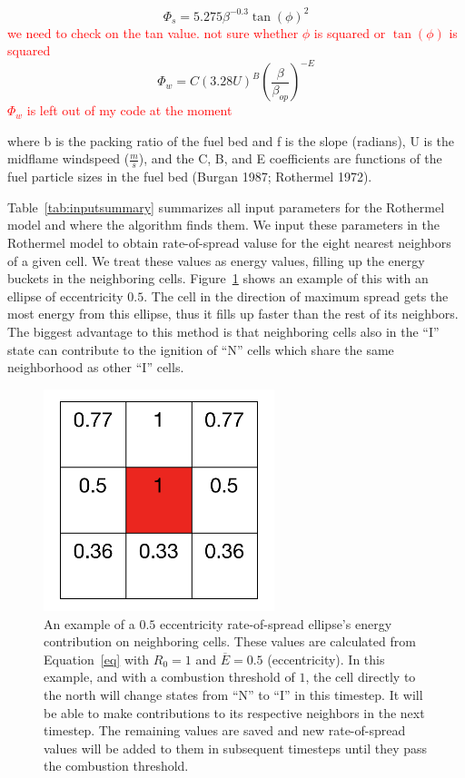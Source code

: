 \documentclass{article}
\newcommand{\note}[1]{\textcolor{red}{#1}}
\begin{document}
\begin{equation}
\Phi_s = 5.275\beta^{-0.3}\tan(\phi)^2
\end{equation}
\note{we need to check on the tan value. not sure whether $\phi$ is squared or $\tan(\phi)$ is squared}
\begin{equation}
\Phi_w = C(3.28U)^B\left(\frac{\beta}{\beta_{op}}\right)^{-E}
\end{equation}
\note{$\Phi_w$ is left out of my code at the moment}

where b is the packing ratio of the fuel bed and f is the slope (radians), U is the midflame windspeed ($\frac{m}{s}$), and the C, B, and E coefficients are functions of the fuel particle sizes in the fuel bed \cite{}(Burgan 1987; Rothermel 1972).

Table~\ref{tab:inputsummary} summarizes all input parameters for the Rothermel model and where the algorithm finds them. We input these parameters in the Rothermel model to obtain rate-of-spread valuse for the eight nearest neighbors of a given cell. We treat these values as energy values, filling up the energy buckets in the neighboring cells. Figure~\ref{fig:buckets} shows an example of this with an ellipse of eccentricity $0.5$. The cell in the direction of maximum spread gets the most energy from this ellipse, thus it fills up faster than the rest of its neighbors. The biggest advantage to this method is that neighboring cells also in the ``I'' state can contribute to the ignition of ``N'' cells which share the same neighborhood as other ``I'' cells. 

\begin{figure}
\centering
\includegraphics[width=0.6\textwidth]{fire_bucket_ex.png}
\caption{An example of a $0.5$ eccentricity rate-of-spread ellipse's energy contribution on neighboring cells. These values are calculated from Equation~\ref{eq} with $R_0 = 1$ and $\overline{E} = 0.5$ (eccentricity). In this example, and with a combustion threshold of $1$, the cell directly to the north will change states from ``N'' to ``I'' in this timestep. It will be able to make contributions to its respective neighbors in the next timestep. The remaining values are saved and new rate-of-spread values will be added to them in subsequent timesteps until they pass the combustion threshold.\label{fig:buckets}}
\end{figure}
\end{document}
